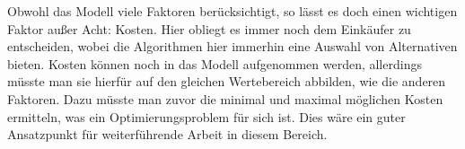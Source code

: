 Obwohl das Modell viele Faktoren berücksichtigt, so lässt es doch einen wichtigen Faktor außer Acht: Kosten.
Hier obliegt es immer noch dem Einkäufer zu entscheiden, wobei die Algorithmen hier immerhin eine Auswahl von Alternativen bieten.
Kosten können noch in das Modell aufgenommen werden, allerdings müsste man sie hierfür auf den gleichen Wertebereich abbilden, wie die anderen Faktoren.
Dazu müsste man zuvor die minimal und maximal möglichen Kosten ermitteln, was ein Optimierungsproblem für sich ist.
Dies wäre ein guter Ansatzpunkt für weiterführende Arbeit in diesem Bereich.
